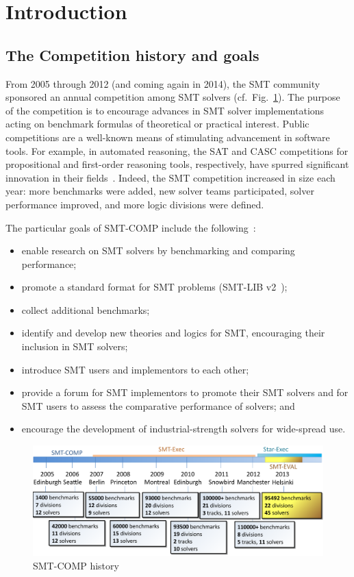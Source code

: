 \documentclass[smallcondensed]{svjour3}
\begin{document}
\section{Introduction}

\subsection{The Competition history and goals}
From 2005 through 2012 (and coming again in 2014), the SMT community
sponsored an annual competition among SMT solvers
(cf.\ Fig.~\ref{Fig:history}).  The purpose of the competition is to
encourage advances in SMT solver implementations acting on benchmark
formulas of theoretical or practical interest.  Public competitions
are a well-known means of stimulating advancement in software tools.
For example, in automated reasoning, the SAT and CASC competitions for
propositional and first-order reasoning tools, respectively, have
spurred significant innovation in their fields~\cite{leberre+03,PSS02}.  Indeed, the SMT competition increased in
size each year: more benchmarks were added, new solver teams
participated, solver performance improved, and more logic divisions were defined.

The particular goals of SMT-COMP include the following~\cite{smtcompweb}:
\begin{itemize}[noitemsep]
\item enable research on SMT solvers by benchmarking and comparing performance;
\item promote a standard format for SMT problems (SMT-LIB v2~\cite{BarST-SMT-10});
\item collect additional benchmarks;
\item identify and develop new theories and logics for SMT, encouraging their inclusion in SMT solvers;
\item introduce SMT users and implementors to each other;
\item provide a forum for SMT implementors to promote their SMT solvers and for SMT users to assess the comparative performance of solvers; and
\item encourage the development of industrial-strength solvers for wide-spread use.
\end{itemize}

\begin{figure}
\centering
\includegraphics[width=\textwidth]{SMTCOMP-History}
\caption{SMT-COMP history}
\label{Fig:history}
\end{figure}
\end{document}

